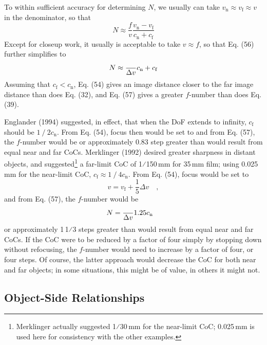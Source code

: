 \documentclass[11pt, oneside]{scrartcl}   	%
\newcommand{\Dv}{\ensuremath{\Delta v}}
\begin{document}
To within sufficient accuracy for determining $N$, we usually can take $v_\mathrm{n} \approx v_\mathrm{f} \approx v$ in the denominator, so that
\begin{equation}
   N\approx\frac f v \frac{v_\mathrm{n}-v_\mathrm{f}}{c_\mathrm{n}+c_\mathrm{f}}
   \label{eq:56}
\end{equation}
Except for closeup work, it usually is acceptable to take $v \approx f$, so that Eq. (56) further simplifies to
\begin{equation}
   N\approx\frac \Dv{c_\mathrm{n}+c_\mathrm{f}}
   \label{eq:57}
\end{equation}
Assuming that $c_\mathrm{f} < c_\mathrm{n}$, Eq. (54) gives an image distance closer to the far image distance than does Eq. (32), and Eq. (57) gives a greater $f$-number than does Eq. (39).

Englander (1994) suggested, in effect, that when the DoF extends to infinity, $c_\mathrm{f}$ should be $1⁄2 c_\mathrm{n}$. From Eq. (54), focus then would be set to
and from Eq. (57), the $f$-number would be
or approximately 0.83 step greater than would result from equal near
and far CoCs. Merklinger (1992) desired greater sharpness in distant
objects, and suggested\footnote{Merklinger actually suggested 1⁄30\,mm
  for the near-limit CoC; 0.025\,mm is used here for consistency with
  the other examples.} a far-limit CoC of 1⁄150\,mm for 35\,mm film;
using 0.025\,mm for the near-limit CoC, $c_\mathrm{f} \approx 1⁄4 c_\mathrm{n}$. From
Eq. (54), focus would be set to
\begin{equation}
  \label{eq:57+++}
  v=v_\mathrm{f}+\frac15\Dv\quad,
\end{equation}
and from Eq. (57), the $f$-number would be
\begin{equation}
  \label{eq:57++++}
  N=\frac \Dv{1.25c_\mathrm{n}}\quad
\end{equation}
or approximately 1\,1⁄3 steps greater than would result from equal near and far CoCs. If the CoC were to be reduced by a factor of four simply by stopping down without refocusing, the $f$-number would need to increase by a factor of four, or four steps. Of course, the latter approach would decrease the CoC for both near and far objects; in some situations, this might be of value, in others it might not.

\subsection{Object-Side Relationships}
\label{sec:object-side-relat}
\end{document}
